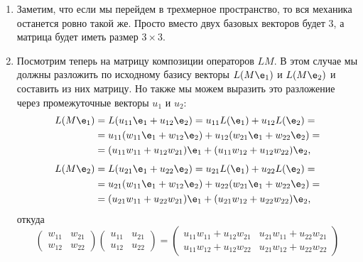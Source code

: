 \begin{enumerate}
\item Заметим, что если мы перейдем в трехмерное пространство, то вся механика останется ровно такой же. Просто вместо двух базовых векторов будет 3, а матрица будет иметь размер $3\times 3$.
\item Посмотрим теперь на матрицу композиции операторов $LM$. В этом случае мы должны разложить по исходному базису векторы $L(M\e_1)$ и $L(M\e_2)$ и составить из них матрицу. Но также мы можем выразить это разложение через промежуточные векторы $u_1$ и $u_2$:
\begin{align*}
L(M\e_1) & = L(u_{11}\e_1+u_{12}\e_2) = u_{11}L(\e_1)+u_{12}L(\e_2) = \\
& = u_{11}(w_{11}\e_1+w_{12}\e_2) + u_{12}(w_{21}\e_1+w_{22}\e_2) = \\
& = (u_{11}w_{11}+u_{12}w_{21})\e_1 + (u_{11}w_{12}+u_{12}w_{22})\e_2,
\end{align*}
\begin{align*}
L(M\e_2) & = L(u_{21}\e_1+u_{22}\e_2) = u_{21}L(\e_1)+u_{22}L(\e_2) = \\
& = u_{21}(w_{11}\e_1+w_{12}\e_2) + u_{22}(w_{21}\e_1+w_{22}\e_2) = \\
& = (u_{21}w_{11}+u_{22}w_{21})\e_1 + (u_{21}w_{12}+u_{22}w_{22})\e_2,
\end{align*}
откуда
$$
\begin{pmatrix}
w_{11} & w_{21} \\ w_{12} & w_{22}
\end{pmatrix}
\begin{pmatrix}
u_{11} & u_{21} \\ u_{12} & u_{22}
\end{pmatrix}
=
\begin{pmatrix}
u_{11}w_{11} + u_{12}w_{21} & u_{21}w_{11} + u_{22}w_{21} \\ 
u_{11}w_{12} + u_{12}w_{22} & u_{21}w_{12} + u_{22}w_{22}
\end{pmatrix}
$$



\end{enumerate}
